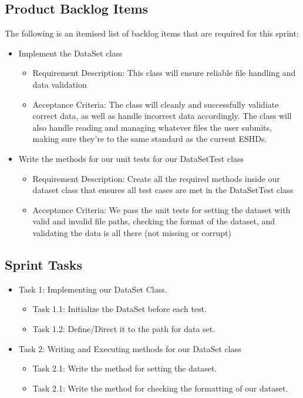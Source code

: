 \documentclass{scrreprt}
\begin{document}
% 
\subsection{Product Backlog Items}

The following is an itemised list of backlog items that are required for this sprint:

\begin{itemize}
    \item Implement the DataSet class
    \begin{itemize}
        \item Requirement Description: This class will ensure reliable file handling and data validation
        \item Acceptance Criteria: The class will cleanly and successfully validiate correct data, as well as handle incorrect data accordingly. The class will also handle reading and managing whatever files the user submits, making sure they're to the same standard as the current ESHDs.
    \end{itemize}
    \item Write the methods for our unit tests for our DataSetTest class
    \begin{itemize}
        \item Requirement Description: Create all the required methods inside our dataset class that ensures all test cases are met in the DataSetTest class
        \item Acceptance Criteria: We pass the unit tests for setting the dataset with valid and invalid file paths, checking the format of the dataset, and validating the data is all there (not missing or corrupt)
    \end{itemize}
\end{itemize}

% 
\subsection{Sprint Tasks}

\begin{itemize}
    \item Task 1: Implementing our DataSet Class.
    \begin{itemize}
        \item Task 1.1: Initialize the DataSet before each test.
        \item Task 1.2: Define/Direct it to the path for data set.
    \end{itemize}
    \item Task 2: Writing and Executing methods for our DataSet class
    \begin{itemize}
        \item Task 2.1: Write the method for setting the dataset.
        \item Task 2.1: Write the method for checking the formatting of our dataset.
    \end{itemize}
\end{itemize}
\end{document}
